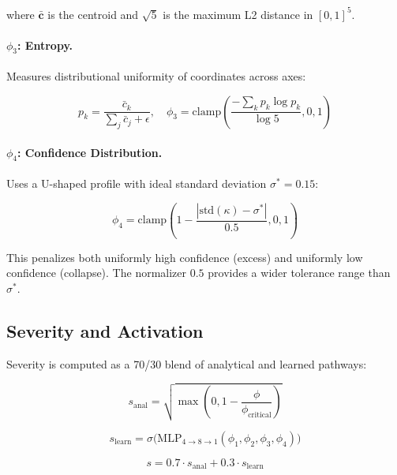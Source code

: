 where $\bar{\bm{c}}$ is the centroid and $\sqrt{5}$ is the maximum
L2 distance in $[0,1]^5$.

\paragraph{$\phi_3$: Entropy.}
Measures distributional uniformity of coordinates across axes:

\begin{equation}
    p_k = \frac{\bar{c}_k}{\sum_j \bar{c}_j + \epsilon}, \quad
    \phi_3 = \text{clamp}\left(\frac{-\sum_k p_k \log p_k}{\log 5}, 0, 1\right)
\end{equation}

\paragraph{$\phi_4$: Confidence Distribution.}
Uses a U-shaped profile with ideal standard deviation $\sigma^* = 0.15$:

\begin{equation}
    \phi_4 = \text{clamp}\left(1 - \frac{|\text{std}(\kappa) - \sigma^*|}{0.5}, 0, 1\right)
\end{equation}

This penalizes both uniformly high confidence (excess) and uniformly
low confidence (collapse). The normalizer $0.5$ provides a wider
tolerance range than $\sigma^*$.

\subsection{Severity and Activation}

Severity is computed as a 70/30 blend of analytical and learned
pathways:

\begin{equation}
    s_{\text{anal}} = \sqrt{\max\left(0, 1 - \frac{\phi}{\phi_{\text{critical}}}\right)}
    \label{eq:vi_severity_anal}
\end{equation}

\begin{equation}
    s_{\text{learn}} = \sigma\big(\text{MLP}_{4 \to 8 \to 1}(\phi_1, \phi_2, \phi_3, \phi_4)\big)
\end{equation}

\begin{equation}
    s = 0.7 \cdot s_{\text{anal}} + 0.3 \cdot s_{\text{learn}}
    \label{eq:vi_severity}
\end{equation}


